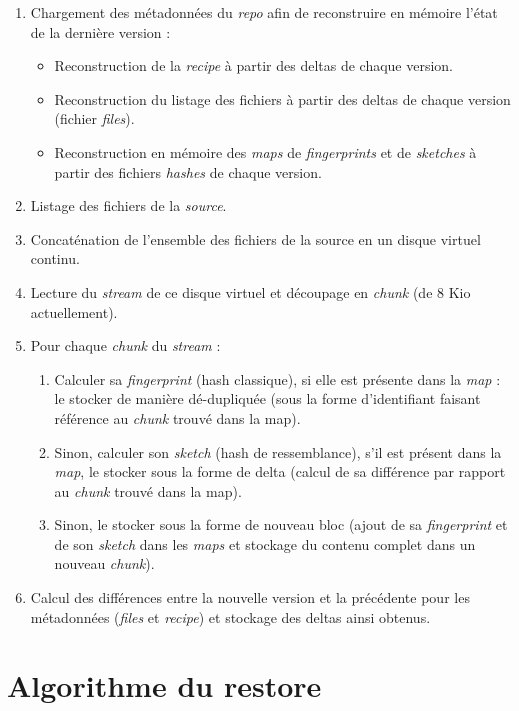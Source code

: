 \documentclass[a4paper]{report}
\begin{document}
\begin{enumerate}
\item
  Chargement des métadonnées du \emph{repo} afin de reconstruire en
  mémoire l'état de la dernière version :

  \begin{itemize}
  \item
    Reconstruction de la \emph{recipe} à partir des deltas de chaque
    version.
  \item
    Reconstruction du listage des fichiers à partir des deltas de chaque
    version (fichier \emph{files}).
  \item
    Reconstruction en mémoire des \emph{maps} de \emph{fingerprints} et
    de \emph{sketches} à partir des fichiers \emph{hashes} de chaque
    version.
  \end{itemize}
\item
  Listage des fichiers de la \emph{source}.
\item
  Concaténation de l'ensemble des fichiers de la source en un disque
  virtuel continu.
\item
  Lecture du \emph{stream} de ce disque virtuel et découpage en
  \emph{chunk} (de 8 Kio actuellement).
\item
  Pour chaque \emph{chunk} du \emph{stream} :

  \begin{enumerate}
  \item
    Calculer sa \emph{fingerprint} (hash classique), si elle est
    présente dans la \emph{map} : le stocker de manière dé-dupliquée
    (sous la forme d'identifiant faisant référence au \emph{chunk}
    trouvé dans la map).
  \item
    Sinon, calculer son \emph{sketch} (hash de ressemblance), s'il est
    présent dans la \emph{map}, le stocker sous la forme de delta
    (calcul de sa différence par rapport au \emph{chunk} trouvé dans la
    map).
  \item
    Sinon, le stocker sous la forme de nouveau bloc (ajout de sa
    \emph{fingerprint} et de son \emph{sketch} dans les \emph{maps} et
    stockage du contenu complet dans un nouveau \emph{chunk}).
  \end{enumerate}
\item
  Calcul des différences entre la nouvelle version et la précédente pour
  les métadonnées (\emph{files} et \emph{recipe}) et stockage des deltas
  ainsi obtenus.
\end{enumerate}

\section{Algorithme du restore}
\end{document}
